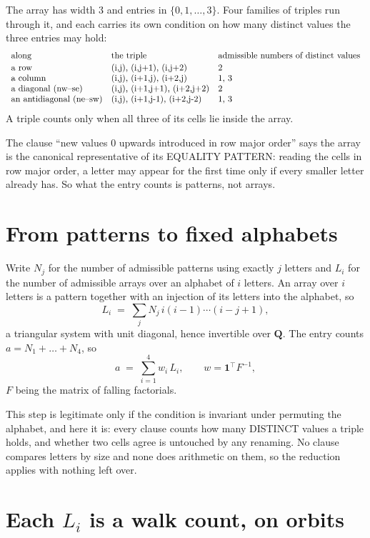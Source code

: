\documentclass[11pt,a4paper]{article}
\theoremstyle{plain}
\theoremstyle{definition}
\begin{document}
The array has width $3$ and entries in $\{0,1,\dots,3\}$. Four families of triples
run through it, and each carries its own condition on how many distinct values the three
entries may hold:
\[
\begin{array}{lll}
\text{along} & \text{the triple} & \text{admissible numbers of distinct values} \\[2pt]
\text{a row} & $(i,j),\ (i,j+1),\ (i,j+2)$ & $2$ \\
\text{a column} & $(i,j),\ (i+1,j),\ (i+2,j)$ & $1, 3$ \\
\text{a diagonal (nw--se)} & $(i,j),\ (i+1,j+1),\ (i+2,j+2)$ & $2$ \\
\text{an antidiagonal (ne--sw)} & $(i,j),\ (i+1,j-1),\ (i+2,j-2)$ & $1, 3$ \\
\end{array}
\]
A triple counts only when all three of its cells lie inside the array.

The clause ``new values $0$ upwards introduced in row major order'' says the array is the
canonical representative of its EQUALITY PATTERN: reading the cells in row major order, a
letter may appear for the first time only if every smaller letter already has. So what the
entry counts is patterns, not arrays.

\section{From patterns to fixed alphabets}

Write $N_j$ for the number of admissible patterns using exactly $j$ letters and $L_i$ for the
number of admissible arrays over an alphabet of $i$ letters. An array over $i$ letters is a
pattern together with an injection of its letters into the alphabet, so
\[
L_i\;=\;\sum_j N_j\,i(i-1)\cdots(i-j+1),
\]
a triangular system with unit diagonal, hence invertible over $\mathbf{Q}$. The entry counts
$a=N_1+\dots+N_{4}$, so
\[
a\;=\;\sum_{i=1}^{4}w_i\,L_i ,\qquad w=\mathbf{1}^{\!\top}F^{-1},
\]
$F$ being the matrix of falling factorials.

This step is legitimate only if the condition is invariant under permuting the alphabet, and
here it is: every clause counts how many DISTINCT values a triple holds, and whether two cells
agree is untouched by any renaming. No clause compares letters by size and none does arithmetic
on them, so the reduction applies with nothing left over.

\section{Each $L_i$ is a walk count, on orbits}
\end{document}
